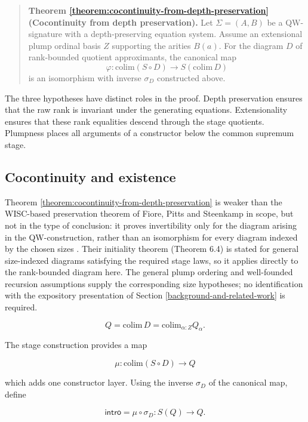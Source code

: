 \documentclass[runningheads]{llncs}
\begin{document}
\begin{quote}
\textbf{Theorem \ref{theorem:cocontinuity-from-depth-preservation} (Cocontinuity from depth preservation).}\label{theorem:cocontinuity-from-depth-preservation} Let
\(\Sigma=(A,B)\) be a QW-signature with a depth-preserving equation
system. Assume an extensional plump ordinal basis \(Z\) supporting the
arities \(B (a)\). For the diagram \(D\) of rank-bounded
quotient approximants, the canonical map \[
\varphi:
\mathrm{colim}(S\circ D)
\longrightarrow
 S (\mathrm{colim}\,D)
\] is an isomorphism with inverse \(\sigma_D\) constructed above.
\end{quote}

The three hypotheses have distinct roles in the proof. Depth
preservation ensures that the raw rank is invariant under the generating
equations. Extensionality ensures that these rank equalities descend
through the stage quotients. Plumpness places all arguments of a constructor below the
common supremum stage.

\subsection{Cocontinuity and
existence}\label{cocontinuity-and-existence}

Theorem \ref{theorem:cocontinuity-from-depth-preservation} is weaker
than the WISC-based preservation theorem of Fiore,
Pitts and Steenkamp in scope, but not in the type of conclusion: it proves
invertibility only for the diagram arising in the QW-construction, rather
than an isomorphism for every diagram indexed by the chosen sizes
\citep{fiore2022-quotient-inductive}. Their initiality theorem
(Theorem 6.4) is stated
for general size-indexed diagrams satisfying the required stage laws, so
it applies directly to the rank-bounded diagram here. The general plump
ordering and well-founded recursion assumptions supply the corresponding
size hypotheses; no identification with the expository presentation of
Section \ref{background-and-related-work} is required.

\[
Q = \mathrm{colim}\,D = \mathrm{colim}_{\alpha:Z} Q_\alpha.
\]

The stage construction provides a map

\[
\mu: \mathrm{colim}(S\circ D) \to Q
\]

which adds one constructor layer. Using the inverse \(\sigma_D\) of the
canonical map, define

\[
\mathsf{intro} = \mu\circ\sigma_D : S (Q)\to Q.
\]
\end{document}
